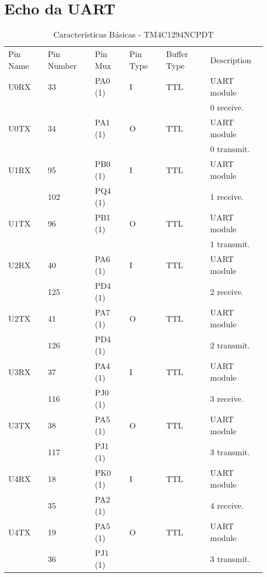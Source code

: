 \section{Echo da UART}

\begin{table}[H]
\centering
\caption{Características Básicas - TM4C1294NCPDT \cite{DATASHEET_TIVA}}
\label{TabelaPinosUart}
\begin{tabular}{|l|l|l|l|l|l|}
\hline
\cellcolor[HTML]{343434} \color[HTML]{FFFFFF} Pin Name & \cellcolor[HTML]{343434} \color[HTML]{FFFFFF} Pin Number & \cellcolor[HTML]{343434} \color[HTML]{FFFFFF} Pin Mux & \cellcolor[HTML]{343434} \color[HTML]{FFFFFF} Pin Type & \cellcolor[HTML]{343434} \color[HTML]{FFFFFF} Buffer Type & \cellcolor[HTML]{343434} \color[HTML]{FFFFFF} Description \\
U0RX & 33 & PA0 (1) & I & TTL & UART module \\
 & & & & & 0 receive.\\
\hline
U0TX & 34 & PA1 (1) & O & TTL & UART module  \\
 & & & & & 0 transmit.\\
\hline
U1RX & 95  & PB0 (1)  & I  & TTL & UART module  \\
     & 102 & PQ4 (1)  &    &   &  1 receive.      \\
\hline
U1TX & 96  & PB1 (1) & O & TTL & UART module \\
 & & & & & 1 transmit.\\
\hline
U2RX & 40 & PA6 (1) & I & TTL & UART module\\
     & 125   & PD4 (1)        &   &     &    2 receive.  \\
\hline
U2TX & 41 & PA7 (1) & O & TTL & UART module \\
     & 126   & PD4 (1)        &   &     &   2 transmit. \\
\hline
U3RX & 37 & PA4 (1) & I & TTL & UART module \\
     &  116 & PJ0 (1) & & & 3 receive. \\
\hline
U3TX & 38 & PA5 (1) & O & TTL & UART module\\
     &  117 & PJ1 (1) & & & 3 transmit.\\
\hline
U4RX & 18 & PK0 (1) & I & TTL & UART module \\
     & 35 & PA2 (1) &  & & 4 receive. \\
\hline
U4TX & 19 & PA5 (1) & O & TTL & UART module \\
     &  36 & PJ1 (1) & & & 3 transmit. \\

\end{tabular}
\end{table}
